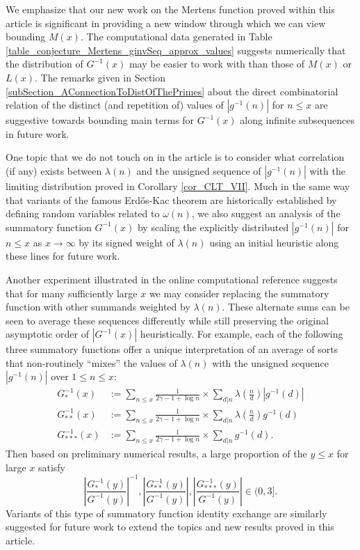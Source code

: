 \documentclass[11pt,reqno,a4letter]{article}
\numberwithin{figure}{section}
\numberwithin{table}{section}
\theoremstyle{plain}
\numberwithin{theorem}{section}
\theoremstyle{definition}
\begin{document}
We emphasize that our new work on the Mertens function proved within this article 
is significant in providing a new window through which we can view bounding $M(x)$. 
The computational data generated in 
Table \ref{table_conjecture_Mertens_ginvSeq_approx_values} suggests numerically 
that the distribution of $G^{-1}(x)$ may be easier to work with 
than those of $M(x)$ or $L(x)$. 
The remarks given in Section \ref{subSection_AConnectionToDistOfThePrimes} 
about the direct combinatorial 
relation of the distinct (and repetition of) values of $|g^{-1}(n)|$ 
for $n \leq x$ are suggestive towards bounding main terms for $G^{-1}(x)$ along 
infinite subsequences in future work. 

One topic that we do not touch on in the article is to consider what 
correlation (if any) exists between $\lambda(n)$ and the unsigned sequence of $|g^{-1}(n)|$ 
with the limiting distribution proved in 
Corollary \ref{cor_CLT_VII}. 
Much in the same way that variants of the famous Erd\H{o}s-Kac theorem are historically established 
by defining random variables related to $\omega(n)$, 
we also suggest an analysis of the summatory function $G^{-1}(x)$ by scaling 
the explicitly distributed $|g^{-1}(n)|$ for $n \leq x$ as $x \rightarrow \infty$ by 
its signed weight of $\lambda(n)$ using an initial heuristic along these lines 
for future work. 

Another experiment illustrated in the online computational reference 
\cite{SCHMIDT-MERTENS-COMPUTATIONS} suggests that 
for many sufficiently large $x$ we may consider replacing the 
summatory function with other summands weighted by $\lambda(n)$. 
These alternate sums can be seen to average these sequences differently while still 
preserving the original asymptotic order of $|G^{-1}(x)|$ heuristically. 
For example, each of the following three summatory functions offer a unique 
interpretation of an average of sorts that non-routinely ``mixes'' the values of 
$\lambda(n)$ with the unsigned sequence $|g^{-1}(n)|$ over $1 \leq n \leq x$: 
\begin{align*}
G_{\ast}^{-1}(x) & := \sum_{n \leq x} \frac{1}{2\gamma-1+\log n} \times 
     \sum_{d|n} \lambda\left(\frac{n}{d}\right) |g^{-1}(d)| \\ 
G_{\ast\ast}^{-1}(x) & := \sum_{n \leq x} \frac{1}{2\gamma-1+\log n} \times 
     \sum_{d|n} \lambda\left(\frac{n}{d}\right) g^{-1}(d) \\ 
G_{\ast\ast\ast}^{-1}(x) & := \sum_{n \leq x} \frac{1}{2\gamma-1+\log n} \times 
     \sum_{d|n} g^{-1}(d). 
\end{align*}
Then based on preliminary numerical results, a large proportion of the $y \leq x$ for 
large $x$ satisfy 
\[
     \left\lvert \frac{G_{\ast}^{-1}(y)}{G^{-1}(y)} \right\rvert^{-1}, 
     \left\lvert \frac{G_{\ast\ast}^{-1}(y)}{G^{-1}(y)} \right\rvert, 
     \left\lvert \frac{G_{\ast\ast\ast}^{-1}(y)}{G^{-1}(y)} \right\rvert \in 
     (0, 3]. 
\]
Variants of this type of summatory function identity exchange are similarly 
suggested for future work to extend the topics and new results proved in this article.
\end{document}
